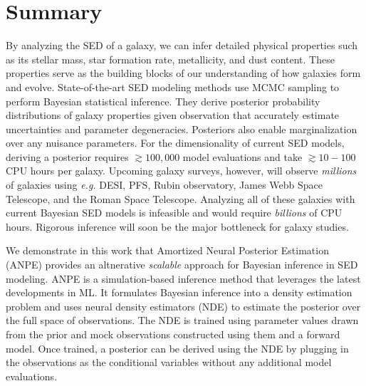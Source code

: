 \section{Summary} \label{sec:summary}
By analyzing the SED of a galaxy, we can infer detailed physical properties
such as its stellar mass, star formation rate, metallicity, and dust content. 
These properties serve as the building blocks of our understanding of how
galaxies form and evolve. 
State-of-the-art SED modeling methods use MCMC sampling to perform Bayesian
statistical inference. 
They derive posterior probability distributions of galaxy properties given
observation that accurately estimate uncertainties and parameter degeneracies. 
Posteriors also enable marginalization over any nuisance parameters. 
For the dimensionality of current SED models, deriving a posterior requires 
${\gtrsim}100,000$ model evaluations and take ${\gtrsim}10-100$ CPU hours per 
galaxy. 
Upcoming galaxy surveys, however, will observe \emph{millions} of galaxies
using \emph{e.g.} DESI, PFS, Rubin observatory, James Webb Space Telescope, and
the Roman Space Telescope. 
Analyzing all of these galaxies with current Bayesian SED models is infeasible
and would require \emph{billions} of CPU hours. 
Rigorous inference will soon be the major bottleneck for galaxy studies. 

We demonstrate in this work that Amortized Neural Posterior Estimation (ANPE)
provides an altnerative \emph{scalable} approach for Bayesian inference in SED
modeling. 
ANPE is a simulation-based inference method that leverages the latest
developments in ML.
It formulates Bayesian inference into a density estimation problem and uses 
neural density estimators (NDE) to estimate the posterior over the full space of
observations. 
The NDE is trained using parameter values drawn from the prior and mock
observations constructed using them and a forward model.  
Once trained, a posterior can be derived using the NDE by plugging in the observations as the conditional variables without any additional model evaluations. 

